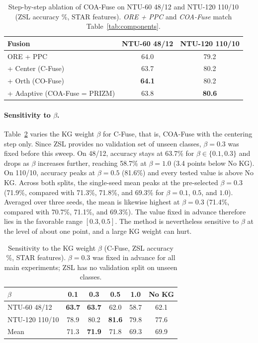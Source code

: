 \documentclass[11pt]{article}
\begin{document}
\begin{table}[htbp]
\centering
\caption{Step-by-step ablation of COA-Fuse on NTU-60 48/12 and NTU-120 110/10 (ZSL accuracy \%, STAR features). \emph{ORE + PPC} and \emph{COA-Fuse} match Table~\ref{tab:components}.}
\label{tab:coa-steps}
\small
\begin{tabular}{l|cc}
\hline
Fusion & NTU-60 48/12 & NTU-120 110/10 \\
\hline
ORE + PPC & 64.0 & 79.2 \\
\quad + Center (C-Fuse) & 63.7 & 80.2 \\
\quad + Orth (CO-Fuse) & \textbf{64.1} & 80.2 \\
\quad + Adaptive (COA-Fuse = PRIZM) & 63.8 & \textbf{80.6} \\
\hline
\end{tabular}
\end{table}

\paragraph{Sensitivity to $\beta$.}
\label{sec:beta}
Table~\ref{tab:beta} varies the KG weight $\beta$ for C-Fuse, that is, COA-Fuse with the centering step only. Since ZSL provides no validation set of unseen classes, $\beta = 0.3$ was fixed before this sweep. On 48/12, accuracy stays at 63.7\% for $\beta \in \{0.1, 0.3\}$ and drops as $\beta$ increases further, reaching 58.7\% at $\beta = 1.0$ (3.4 points below No KG). On 110/10, accuracy peaks at $\beta = 0.5$ (81.6\%) and every tested value is above No KG. Across both splits, the single-seed mean peaks at the pre-selected $\beta = 0.3$ (71.9\%, compared with 71.3\%, 71.8\%, and 69.3\% for $\beta = 0.1$, $0.5$, and $1.0$). Averaged over three seeds, the mean is likewise highest at $\beta = 0.3$ (71.4\%, compared with 70.7\%, 71.1\%, and 69.3\%). The value fixed in advance therefore lies in the favorable range $[0.3, 0.5]$. The method is nevertheless sensitive to $\beta$ at the level of about one point, and a large KG weight can hurt.

\begin{table}[htbp]
\centering
\caption{Sensitivity to the KG weight $\beta$ (C-Fuse, ZSL accuracy \%, STAR features). $\beta = 0.3$ was fixed in advance for all main experiments; ZSL has no validation split on unseen classes.}
\label{tab:beta}
\small
\begin{tabular}{l|cccc|c}
\hline
$\beta$ & 0.1 & 0.3 & 0.5 & 1.0 & No KG \\
\hline
NTU-60 48/12 & \textbf{63.7} & \textbf{63.7} & 62.0 & 58.7 & 62.1 \\
NTU-120 110/10 & 78.9 & 80.2 & \textbf{81.6} & 79.8 & 77.6 \\
\hline
Mean & 71.3 & \textbf{71.9} & 71.8 & 69.3 & 69.9 \\
\hline
\end{tabular}
\end{table}
\end{document}
